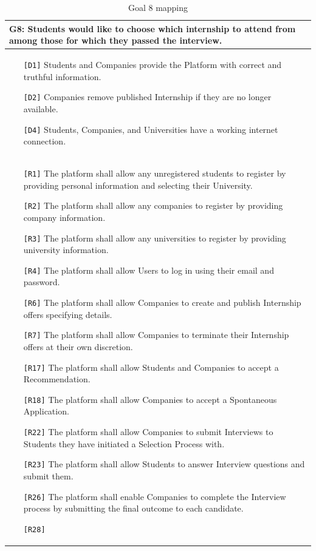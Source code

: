 \begin{table}[H]
    \centering
    \begin{tabular}{|p{15cm}|}
        \hline
        \textbf{G8:} Students would like to choose which internship to attend from among those for which they passed the interview. \\ \hline
        \begin{itemize}
            \item[\texttt{[D1]}] Students and Companies provide the Platform with correct and truthful information.
            \item[\texttt{[D2]}] Companies remove published Internship if they are no longer available. 
            \item[\texttt{[D4]}] Students, Companies, and Universities have a working internet connection.
        \end{itemize} \\ \hline
        \begin{itemize}
            \item[\texttt{[R1]}] The platform shall allow any unregistered students to register by providing personal information and selecting their University.
            \item[\texttt{[R2]}] The platform shall allow any companies to register by providing company information.
            \item[\texttt{[R3]}] The platform shall allow any universities to register by providing university information.
            \item[\texttt{[R4]}] The platform shall allow Users to log in using their email and password.
            \item[\texttt{[R6]}] The platform shall allow Companies to create and publish Internship offers specifying details.
            \item[\texttt{[R7]}] The platform shall allow Companies to terminate their Internship offers at their own discretion.
            \item[\texttt{[R17]}] The platform shall allow Students and Companies to accept a Recommendation.
            \item[\texttt{[R18]}] The platform shall allow Companies to accept a Spontaneous Application.
            \item[\texttt{[R22]}] The platform shall allow Companies to submit Interviews to Students they have initiated a Selection Process with.
            \item[\texttt{[R23]}] The platform shall allow Students to answer Interview questions and submit them.
            \item[\texttt{[R26]}] The platform shall enable Companies to complete the Interview process by submitting the final outcome to each candidate.
            \item[\texttt{[R28]}]
        \end{itemize} \\ \hline
    \end{tabular}
    \caption{Goal 8 mapping}
    \label{tab:G8}
\end{table}


